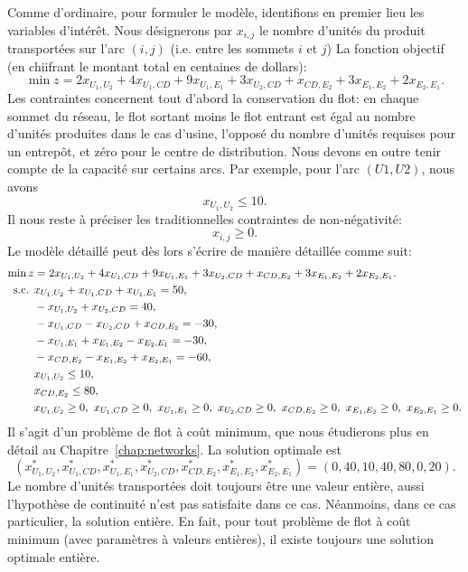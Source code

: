 \begin{example}
Comme d'ordinaire, pour formuler le modèle, identifions en premier lieu les variables d'intérêt. Nous désignerons par $x_{i,j}$ le nombre d'unités du produit transportées sur
l'arc $(i,j)$ (i.e. entre les sommets $i$ et $j$)
La fonction objectif (en chiifrant le montant total en centaines de dollars):
\[
\min z = 2 x_{U_1,U_2} + 4 x_{U_1,CD} + 9 x_{U_1,E_1} + 3 x_{U_2,CD} + x_{CD,E_2} + 3 x_{E_1,E_2} + 2 x_{E_2,E_1}.
\]
Les contraintes concernent tout d'abord la conservation du flot: en chaque sommet du réseau,
le flot sortant moins le flot entrant est égal au nombre d'unités produites dans le cas d'usine, l'opposé du nombre d'unités requises pour un entrepôt, et zéro pour le centre de distribution.
Nous devons en outre tenir compte de la capacité sur certains arcs.
Par exemple, pour l'arc $(U1,U2)$, nous avons
\[
x_{U_1,U_2} \leq 10.
\]
Il nous reste à préciser les traditionnelles contraintes de non-négativité:
\[
x_{i,j} \geq 0.
\]
Le modèle détaillé peut dès lors s'écrire de manière détaillée comme suit:
\begin{align*}
\min z & = 2 x_{U_1,U_2} + 4 x_{U_1,CD} + 9 x_{U_1,E_1} + 3 x_{U_2,CD} + x_{CD,E_2} + 3 x_{E_1,E_2} + 2 x_{E_2,E_1}. \\
\st & x_{U_1,U_2} + x_{U_1,CD} + x_{U_1,E_1} = 50, \\
& -x_{U_1,U_2} + x_{U_2,CD} = 40, \\
& -x_{U_1,CD} - x_{U_2,CD} + x_{CD,E_2} = -30, \\
& -x_{U_1,E_1} + x_{E_1,E_2} - x_{E_2,E_1} = -30, \\
& -x_{CD,E_2} - x_{E_1,E_2} + x_{E_2,E_1} = -60, \\
& x_{U_1,U_2} \leq 10, \\
& x_{CD,E_2} \leq 80, \\
& x_{U_1,U_2} \geq 0,\ x_{U_1,CD} \geq 0,\ x_{U_1,E_1} \geq 0,\ x_{U_2,CD} \geq 0,\ x_{CD,E_2} \geq 0,\ x_{E_1,E_2} \geq 0,\ x_{E_2,E_1} \geq 0.
\end{align*}
Il s'agit d'un problème de flot à coût minimum, que nous étudierons plus en détail au Chapitre~\ref{chap:networks}.
La solution optimale est
\[
(x^*_{U_1,U_2}, x^*_{U_1,CD}, x^*_{U_1,E_1}, x^*_{U_2,CD}, x^*_{CD,E_2}, x^*_{E_1,E_2}, x^*_{E_2,E_1}) = (0, 40, 10, 40, 80, 0, 20).
\]
Le nombre d'unités transportées doit toujours être une valeur entière, aussi l'hypothèse de continuité n'est pas satisfaite dans ce cas.
Néanmoins, dans ce cas particulier, la solution entière.
En fait, pour tout problème de flot à coût minimum (avec paramètres à valeurs entières), il existe toujours une solution optimale entière.
\end{example}

